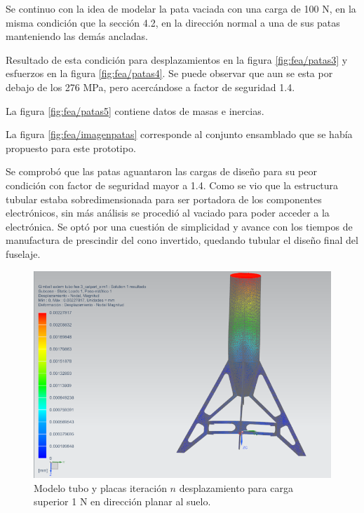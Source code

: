 Se continuo con la idea de modelar la pata vaciada con una carga de 100 N, en la misma condición que la sección 4.2, en la dirección normal a una de sus patas manteniendo las demás ancladas. 

Resultado de esta condición para desplazamientos en la figura \ref{fig:fea/patas3} y esfuerzos en la figura \ref{fig:fea/patas4}. Se puede observar que aun se esta por debajo de los 276 MPa, pero acercándose a factor de seguridad 1.4.

La figura \ref{fig:fea/patas5} contiene datos de masas e inercias.

La figura \ref{fig:fea/imagenpatas} corresponde al conjunto ensamblado que se había propuesto para este prototipo.

\medskip

Se comprobó que las patas aguantaron las cargas de diseño para su peor condición con
factor de seguridad mayor a 1.4.
Como se vio que la estructura tubular estaba sobredimensionada para ser portadora de
los componentes electrónicos, sin más análisis se procedió al vaciado para poder acceder
a la electrónica. Se optó por una cuestión de simplicidad y avance con los tiempos de
manufactura de prescindir del cono invertido, quedando tubular el diseño final del
fuselaje.



\begin{figure}[htb]
    \centering
    \includegraphics[height=0.2\pdfpageheight]{fig/fea/patas1.png}
    \caption{Modelo tubo y placas iteración $n$ desplazamiento para carga superior 1 N en dirección planar al suelo.}
    \label{fig:fea/patas1}
\end{figure}

